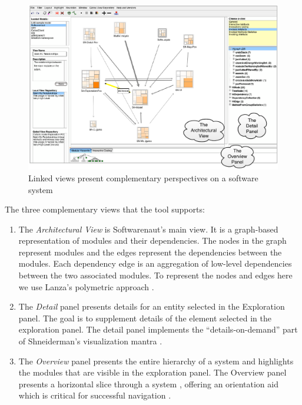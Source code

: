 \documentclass[preprint,12pt]{elsarticle}
\begin{document}
\begin{figure}[ht]
\begin{center}
\includegraphics[width=\linewidth]{SnautOnSnaut.pdf}
\caption{Linked views present complementary perspectives on a software system }
\end{center}
\end{figure}

The three complementary views that the tool supports:

\begin{enumerate}

\item The {\em Architectural View} is Softwarenaut's main view. It is a graph-based representation of modules and their dependencies. The nodes in the graph represent modules and the edges represent the dependencies between the modules. Each dependency edge is an aggregation of low-level dependencies between the two associated modules. To represent the nodes and edges here we use Lanza's polymetric approach \cite{lanza-pv, lanza-oomp}. 

\item The {\em Detail} panel presents details for an entity selected in the Exploration panel. The goal is to supplement details of the element selected in the exploration panel. The detail panel implements the ``details-on-demand'' part of Shneiderman's visualization mantra \cite{shneid-eyes}.

\item The {\em Overview} panel presents the entire hierarchy of a system and highlights the modules that are visible in the exploration panel. The Overview panel presents a horizontal slice through a system \cite{wong-thesis}, offering an orientation aid which is critical for successful navigation \cite{storey-awareness}.

\end{enumerate}
\end{document}
